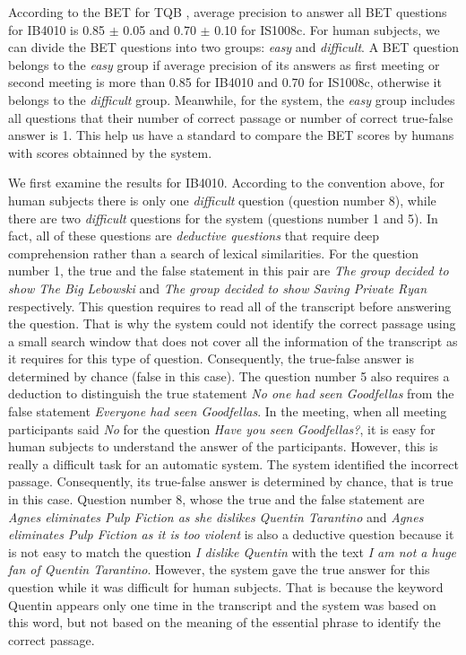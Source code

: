 

According to the BET for TQB \cite{popescubelis2007otm}, average precision to answer all BET questions for IB4010 is 0.85 \ensuremath{\pm} 0.05 and 0.70 \ensuremath{\pm} 0.10 for IS1008c. For human subjects, we can divide the BET questions into two groups: \textit{easy} and \textit{difficult}. A BET question belongs to the \textit{easy} group  if average precision of its answers as first meeting or second meeting is more than 0.85 for IB4010 and 0.70 for IS1008c, otherwise it belongs to the \textit{difficult} group. Meanwhile, for the system, the \textit{easy} group includes all questions that  their number of correct passage or number of correct true-false answer is 1.
This help us have a standard to compare the BET scores by humans with scores obtainned by the system.

We first examine the results for IB4010. According to the convention above, for human subjects there is only one \textit{difficult} question (question number 8), while there are two \textit{difficult} questions for the system (questions number 1 and 5). In fact, all of these questions are \textit{deductive questions} that require deep comprehension rather than a search of lexical similarities. For the question number 1, the true and the false statement in this pair are \textit{The group decided to show The Big Lebowski} and \textit{The group decided to show Saving Private Ryan} respectively. This question requires to read all of the transcript before answering the question. That is why the system could not identify the correct passage using a small search window that does not cover all the information of the transcript as it requires for this type of question. Consequently, the true-false answer is determined by chance (false in this case). The question number 5 also requires a deduction to distinguish the true statement \textit{No one had seen Goodfellas} from the false statement \textit{Everyone  had seen Goodfellas}. In the meeting, when all meeting participants said \textit{No} for the question \textit{Have you seen Goodfellas?}, it is easy for human subjects to understand the answer of the participants. However, this is really a difficult task for an automatic system.  The system identified the incorrect passage. Consequently, its true-false answer is determined by chance, that is true in this case. Question number 8, whose the true and the false statement are \textit{Agnes eliminates Pulp Fiction as she dislikes Quentin Tarantino} and \textit{Agnes eliminates Pulp Fiction as it is too violent} is also a deductive question because it is not easy to match the question \textit{I dislike Quentin} with the text \textit{I am not a huge fan of Quentin Tarantino}. However, the system gave the true answer for this question while it was difficult for human subjects. That is because the keyword Quentin appears only one time in the transcript and the system was based on this word, but not based on the meaning of the essential phrase to identify the correct passage.

